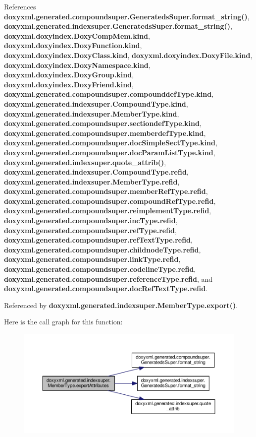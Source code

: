 References {\bf doxyxml.\+generated.\+compoundsuper.\+Generateds\+Super.\+format\+\_\+string()}, {\bf doxyxml.\+generated.\+indexsuper.\+Generateds\+Super.\+format\+\_\+string()}, {\bf doxyxml.\+doxyindex.\+Doxy\+Comp\+Mem.\+kind}, {\bf doxyxml.\+doxyindex.\+Doxy\+Function.\+kind}, {\bf doxyxml.\+doxyindex.\+Doxy\+Class.\+kind}, {\bf doxyxml.\+doxyindex.\+Doxy\+File.\+kind}, {\bf doxyxml.\+doxyindex.\+Doxy\+Namespace.\+kind}, {\bf doxyxml.\+doxyindex.\+Doxy\+Group.\+kind}, {\bf doxyxml.\+doxyindex.\+Doxy\+Friend.\+kind}, {\bf doxyxml.\+generated.\+compoundsuper.\+compounddef\+Type.\+kind}, {\bf doxyxml.\+generated.\+indexsuper.\+Compound\+Type.\+kind}, {\bf doxyxml.\+generated.\+indexsuper.\+Member\+Type.\+kind}, {\bf doxyxml.\+generated.\+compoundsuper.\+sectiondef\+Type.\+kind}, {\bf doxyxml.\+generated.\+compoundsuper.\+memberdef\+Type.\+kind}, {\bf doxyxml.\+generated.\+compoundsuper.\+doc\+Simple\+Sect\+Type.\+kind}, {\bf doxyxml.\+generated.\+compoundsuper.\+doc\+Param\+List\+Type.\+kind}, {\bf doxyxml.\+generated.\+indexsuper.\+quote\+\_\+attrib()}, {\bf doxyxml.\+generated.\+indexsuper.\+Compound\+Type.\+refid}, {\bf doxyxml.\+generated.\+indexsuper.\+Member\+Type.\+refid}, {\bf doxyxml.\+generated.\+compoundsuper.\+member\+Ref\+Type.\+refid}, {\bf doxyxml.\+generated.\+compoundsuper.\+compound\+Ref\+Type.\+refid}, {\bf doxyxml.\+generated.\+compoundsuper.\+reimplement\+Type.\+refid}, {\bf doxyxml.\+generated.\+compoundsuper.\+inc\+Type.\+refid}, {\bf doxyxml.\+generated.\+compoundsuper.\+ref\+Type.\+refid}, {\bf doxyxml.\+generated.\+compoundsuper.\+ref\+Text\+Type.\+refid}, {\bf doxyxml.\+generated.\+compoundsuper.\+childnode\+Type.\+refid}, {\bf doxyxml.\+generated.\+compoundsuper.\+link\+Type.\+refid}, {\bf doxyxml.\+generated.\+compoundsuper.\+codeline\+Type.\+refid}, {\bf doxyxml.\+generated.\+compoundsuper.\+reference\+Type.\+refid}, and {\bf doxyxml.\+generated.\+compoundsuper.\+doc\+Ref\+Text\+Type.\+refid}.



Referenced by {\bf doxyxml.\+generated.\+indexsuper.\+Member\+Type.\+export()}.



Here is the call graph for this function\+:
\nopagebreak
\begin{figure}[H]
\begin{center}
\leavevmode
\includegraphics[width=350pt]{d0/da4/classdoxyxml_1_1generated_1_1indexsuper_1_1MemberType_ac05e85039a06d7024852ce814364449d_cgraph}
\end{center}
\end{figure}




